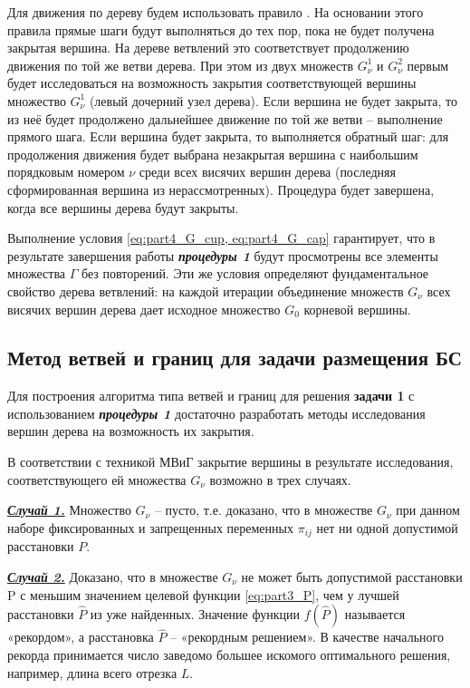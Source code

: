 Для движения по дереву будем использовать правило . На основании этого правила прямые шаги будут выполняться до тех пор, пока не будет получена закрытая вершина. На дереве ветвлений это соответствует продолжению движения по той же ветви дерева. При этом из двух множеств $G^1_\nu$  и $G^2_\nu$ первым будет исследоваться на возможность закрытия соответствующей вершины множество $G^1_\nu$ (левый дочерний узел дерева). Если вершина не будет закрыта, то из неё будет продолжено дальнейшее движение по той же ветви -- выполнение прямого шага. Если вершина будет закрыта, то выполняется обратный шаг: для продолжения движения будет выбрана незакрытая вершина с наибольшим порядковым номером $\nu$ среди всех висячих вершин дерева (последняя сформированная вершина из нерассмотренных). Процедура будет завершена, когда все вершины дерева будут закрыты.

Выполнение условия \cref{eq:part4_G_cup, eq:part4_G_cap} гарантирует, что в результате завершения работы \textit{\textbf{процедуры 1}} будут просмотрены все элементы множества $\Gamma$ без повторений. Эти же условия определяют фундаментальное свойство дерева ветвлений: на каждой итерации объединение множеств $G_\nu$ всех висячих вершин дерева дает исходное множество $G_0$ корневой вершины.

\subsection{Метод ветвей и границ для задачи размещения БС} \label{BnB}
Для построения алгоритма типа ветвей и границ для решения \textbf{задачи 1} с использованием \textit{\textbf{процедуры 1}} достаточно разработать методы исследования вершин дерева на возможность их закрытия.

В соответствии с техникой МВиГ закрытие вершины в результате исследования, соответствующего ей множества $G_\nu$ возможно в трех случаях.

\underline{\textit{\textbf{Случай 1.}}} Множество $G_\nu$ -- пусто, т.е. доказано, что в множестве $G_\nu$ при данном наборе фиксированных и запрещенных переменных $\pi_{ij}$ нет ни одной допустимой расстановки $P$.

\underline{\textit{\textbf{Случай 2.}}} Доказано, что в множестве $G_\nu$ не может быть допустимой расстановки P с меньшим значением целевой функции \cref{eq:part3_P}, чем у лучшей расстановки $\widehat{P}$ из уже найденных. Значение функции $f(\widehat{P})$ называется «рекордом», а расстановка $\widehat{P}$ -- «рекордным решением». В качестве начального рекорда принимается число заведомо большее искомого оптимального решения, например,  длина всего отрезка $L$.

